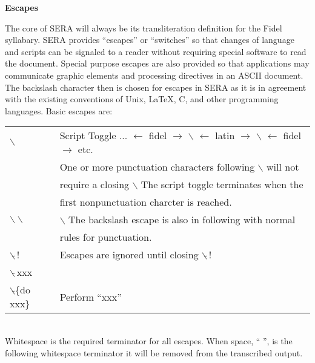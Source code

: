 \newpage
 
\noi
{\large\bf Escapes} \\

\noi
%
%
%


The core of SERA will always be its transliteration definition for the Fidel
syllabary. SERA provides ``escapes'' or ``switches'' so that changes of
language and scripts can be signaled to a reader without requiring special
software to read the document. Special purpose escapes are also provided so
that applications may communicate graphic elements and processing directives in
an ASCII document. \\

The backslash character then is chosen for escapes in SERA as it is in
agreement with the existing conventions of Unix, \LaTeX, C, and other
programming languages. Basic escapes are:\\


\noi
\begin{tabular}{|l|l|} \hline
  $\backslash$   &   Script Toggle ... $\leftarrow$ fidel $\rightarrow$ $\backslash$ $\leftarrow$ latin $\rightarrow$ $\backslash$ $\leftarrow$ fidel $\rightarrow$ etc. \\
                 &   One or more punctuation characters following $\backslash$ will not \\
                 &   require a closing $\backslash$  The script toggle terminates when the \\
                 &   first nonpunctuation charcter is reached. \\ \hline

  $\backslash\backslash$    &   $\backslash$ The backslash escape is also in following with normal \\
                 &    rules for punctuation. \\ \hline

  $\backslash\tilde{}\,$!   &   Escapes are ignored until closing $\backslash\tilde{}\,$!  \\ \hline

  $\backslash\tilde{}\,$xxx &  \\
  $\backslash\tilde{}$\{do xxx\}    &       Perform ``xxx''  \\ \hline
\end{tabular} \\

\noi
Whitespace is the required terminator for all escapes. When space, `` '',
is the following whitespace terminator it will be removed from the transcribed
output. 



%
%

